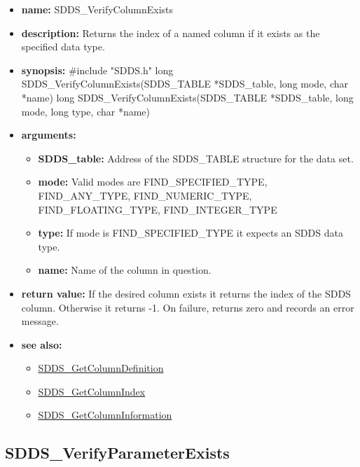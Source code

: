 \documentclass[11pt]{article}
\newcommand{\progref}[1]{\hyperref{SDDS_#1}{{\tt SDDS\_#1} (}{)}{SDDS_#1}}
\begin{document}
\begin{itemize}
\item {\bf name:}\newline
SDDS\_VerifyColumnExists
\item {\bf description:}\newline
Returns the index of a named column if it exists as the specified data type.
\item {\bf synopsis:} \#include "SDDS.h"\newline
long SDDS\_VerifyColumnExists(SDDS\_TABLE *SDDS\_table, long mode, char *name)
long SDDS\_VerifyColumnExists(SDDS\_TABLE *SDDS\_table, long mode, long type, char *name)
\item {\bf arguments:}
\begin{itemize}
\item {\bf SDDS\_table:} Address of the SDDS\_TABLE structure for the data set.
\item {\bf mode:} Valid modes are FIND\_SPECIFIED\_TYPE, FIND\_ANY\_TYPE, FIND\_NUMERIC\_TYPE, FIND\_FLOATING\_TYPE, FIND\_INTEGER\_TYPE
\item {\bf type:} If mode is FIND\_SPECIFIED\_TYPE it expects an SDDS data type.
\item {\bf name:} Name of the column in question.
\end{itemize}
\item {\bf return value:}\newline
If the desired column exists it returns the index of the SDDS column. Otherwise it returns -1.\newline
\newline
On failure, returns zero and records an error message. 
\item {\bf see also:}
\begin{itemize}
\item \progref{GetColumnDefinition}
\item \progref{GetColumnIndex}
\item \progref{GetColumnInformation}
\end{itemize}
\end{itemize}

\subsection{SDDS\_VerifyParameterExists}
\label{SDDS_VerifyParameterExists}
\end{document}
